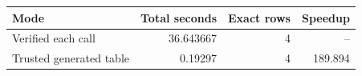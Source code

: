 {\small
\begin{tabular}{lrrr}
\hline
Mode & Total seconds & Exact rows & Speedup \\
\hline
Verified each call & 36.643667 & 4 & -- \\
Trusted generated table & 0.19297 & 4 & 189.894 \\
\hline
\end{tabular}
}

